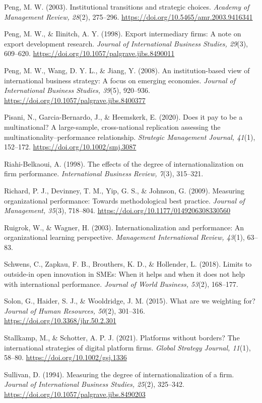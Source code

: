 \documentclass[
  a4paper,
  13pt]{extreport}
\begin{document}
Peng, M. W. (2003). Institutional transitions and strategic choices.
\emph{Academy of Management Review, 28}(2), 275--296.
\url{https://doi.org/10.5465/amr.2003.9416341}

Peng, M. W., \& Ilinitch, A. Y. (1998). Export intermediary firms: A
note on export development research. \emph{Journal of International
Business Studies, 29}(3), 609--620.
\url{https://doi.org/10.1057/palgrave.jibs.8490011}

Peng, M. W., Wang, D. Y. L., \& Jiang, Y. (2008). An institution-based
view of international business strategy: A focus on emerging economies.
\emph{Journal of International Business Studies, 39}(5), 920--936.
\url{https://doi.org/10.1057/palgrave.jibs.8400377}

Pisani, N., Garcia-Bernardo, J., \& Heemskerk, E. (2020). Does it pay to
be a multinational? A large-sample, cross-national replication assessing
the multinationality--performance relationship. \emph{Strategic
Management Journal, 41}(1), 152--172.
\url{https://doi.org/10.1002/smj.3087}

Riahi-Belkaoui, A. (1998). The effects of the degree of
internationalization on firm performance. \emph{International Business
Review, 7}(3), 315--321.

Richard, P. J., Devinney, T. M., Yip, G. S., \& Johnson, G. (2009).
Measuring organizational performance: Towards methodological best
practice. \emph{Journal of Management, 35}(3), 718--804.
\url{https://doi.org/10.1177/0149206308330560}

Ruigrok, W., \& Wagner, H. (2003). Internationalization and performance:
An organizational learning perspective. \emph{Management International
Review, 43}(1), 63--83.

Schwens, C., Zapkau, F. B., Brouthers, K. D., \& Hollender, L. (2018).
Limits to outside-in open innovation in SMEs: When it helps and when it
does not help with international performance. \emph{Journal of World
Business, 53}(2), 168--177.

Solon, G., Haider, S. J., \& Wooldridge, J. M. (2015). What are we
weighting for? \emph{Journal of Human Resources, 50}(2), 301--316.
\url{https://doi.org/10.3368/jhr.50.2.301}

Stallkamp, M., \& Schotter, A. P. J. (2021). Platforms without borders?
The international strategies of digital platform firms. \emph{Global
Strategy Journal, 11}(1), 58--80. \url{https://doi.org/10.1002/gsj.1336}

Sullivan, D. (1994). Measuring the degree of internationalization of a
firm. \emph{Journal of International Business Studies, 25}(2), 325--342.
\url{https://doi.org/10.1057/palgrave.jibs.8490203}
\end{document}
